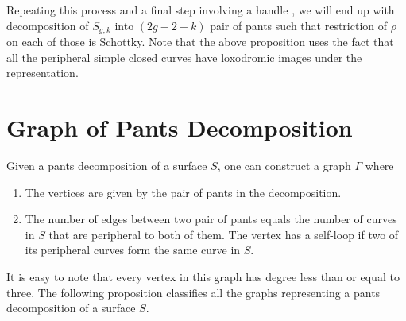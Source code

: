 Repeating this process and a final step involving a handle \cite[Section 5.7]{GKM}, we will end up with decomposition of $S_{g,k}$ into $(2g-2+k)$ pair of pants such that restriction of $\rho$ on each of those is Schottky. Note that the above proposition uses the fact that all the peripheral simple closed curves have loxodromic images under the representation.

\section{Graph of Pants Decomposition}

Given a pants decomposition of a surface $S$, one can construct a graph $\Gamma$ where
\begin{enumerate}
	\item The vertices are given by the pair of pants in the decomposition.
	\item The number of edges between two pair of pants equals the number of curves in $S$ that are peripheral to both of them. The vertex has a self-loop if two of its peripheral curves form the same curve in $S$.
\end{enumerate}

It is easy to note that every vertex in this graph has degree less than or equal to three. The following proposition classifies all the graphs representing a pants decomposition of a surface $S$.

